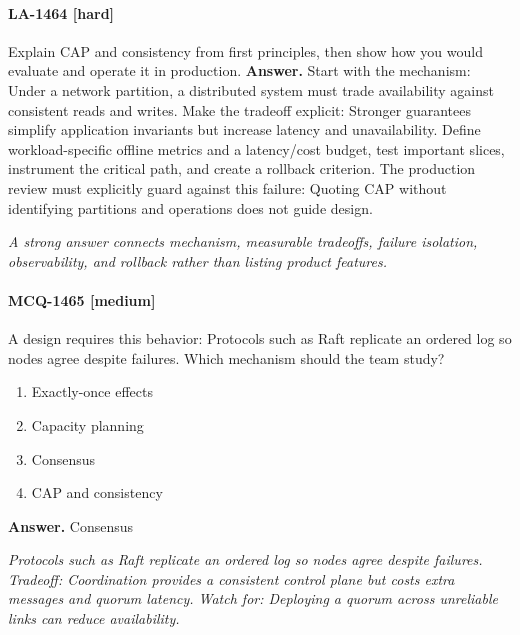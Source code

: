 \paragraph{LA-1464 [hard]} Explain CAP and consistency from first principles, then show how you would evaluate and operate it in production.
\noindent\textbf{Answer.} Start with the mechanism: Under a network partition, a distributed system must trade availability against consistent reads and writes. Make the tradeoff explicit: Stronger guarantees simplify application invariants but increase latency and unavailability. Define workload-specific offline metrics and a latency/cost budget, test important slices, instrument the critical path, and create a rollback criterion. The production review must explicitly guard against this failure: Quoting CAP without identifying partitions and operations does not guide design.
\par\textit{A strong answer connects mechanism, measurable tradeoffs, failure isolation, observability, and rollback rather than listing product features.}
\paragraph{MCQ-1465 [medium]} A design requires this behavior: Protocols such as Raft replicate an ordered log so nodes agree despite failures. Which mechanism should the team study?
\begin{enumerate}[label=\Alph*.]
\item Exactly-once effects
\item Capacity planning
\item Consensus
\item CAP and consistency
\end{enumerate}
\noindent\textbf{Answer.} Consensus
\par\textit{Protocols such as Raft replicate an ordered log so nodes agree despite failures. Tradeoff: Coordination provides a consistent control plane but costs extra messages and quorum latency. Watch for: Deploying a quorum across unreliable links can reduce availability.}
